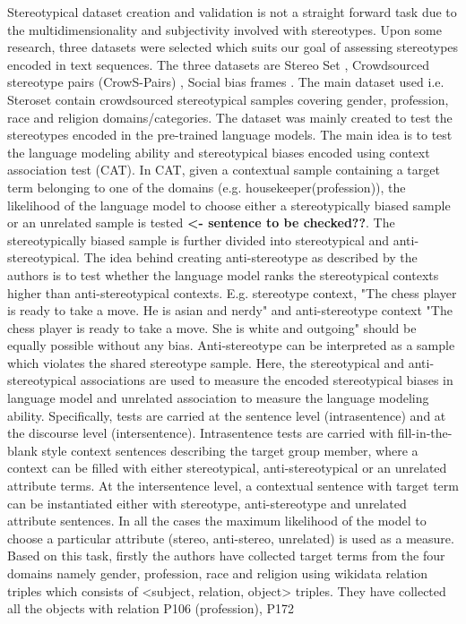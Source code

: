 Stereotypical dataset creation and validation is not a straight forward task due to the multidimensionality and subjectivity involved with stereotypes. Upon some research, three datasets were selected which suits our goal of assessing stereotypes encoded in text sequences. The three datasets are Stereo Set \cite{nadeem2020stereoset}, Crowdsourced stereotype pairs (CrowS-Pairs) \cite{nangia2020crows}, Social bias frames \cite{sap2019social}. The main dataset used i.e. Steroset \cite{nadeem2020stereoset} contain crowdsourced stereotypical samples covering gender, profession, race and religion domains/categories. The dataset was mainly created to test the stereotypes encoded in the pre-trained language models. The main idea is to test the language modeling ability and stereotypical biases encoded using context association test (CAT). In CAT, given a contextual sample containing a target term belonging to one of the domains (e.g. housekeeper(profession)), the likelihood of the language model to choose either a stereotypically biased sample or an unrelated sample is tested \textbf{<- sentence to be checked??}. The stereotypically biased sample is further divided into stereotypical and anti-stereotypical. The idea behind creating anti-stereotype as described by the authors is to test whether the language model ranks the stereotypical contexts higher than anti-stereotypical contexts. E.g. stereotype context, "The chess player is ready to take a move. He is asian and nerdy" and anti-stereotype context "The chess player is ready to take a move. She is white and outgoing" should be equally possible without any bias. Anti-stereotype can be interpreted as a sample which violates the shared stereotype sample. Here, the stereotypical and anti-stereotypical associations are used to measure the encoded stereotypical biases in language model and unrelated association to measure the language modeling ability. Specifically, tests are carried at the sentence level (intrasentence) and at the discourse level (intersentence). Intrasentence tests are carried with fill-in-the-blank style context sentences describing the target group member, where a context can be filled with either stereotypical, anti-stereotypical or an unrelated attribute terms. At the intersentence level, a contextual sentence with target term can be instantiated either with stereotype, anti-stereotype and unrelated attribute sentences. In all the cases the maximum likelihood of the model to choose a particular attribute (stereo, anti-stereo, unrelated) is used as a measure. Based on this task, firstly the authors have collected target terms from the four domains namely gender, profession, race and religion using wikidata relation triples \cite{vrandevcic2014wikidata} which consists of <subject, relation, object> triples. They have collected all the objects with relation P106 (profession), P172
